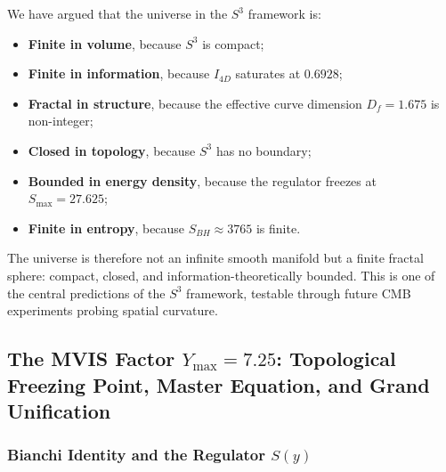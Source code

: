 \documentclass[a4paper,1pt,oneside,openany]{book}
\begin{document}
We have argued that the universe in the $S^{3}$ framework is:
\begin{itemize}
\item \textbf{Finite in volume}, because $S^{3}$ is compact;
\item \textbf{Finite in information}, because $I_{4D}$ saturates 
at $0.6928$;
\item \textbf{Fractal in structure}, because the effective 
curve dimension $D_{f}=1.675$ is non-integer;
\item \textbf{Closed in topology}, because $S^{3}$ has no 
boundary;
\item \textbf{Bounded in energy density}, because the regulator 
freezes at $S_{\max}=27.625$;
\item \textbf{Finite in entropy}, because $S_{BH}\approx 3765$ 
is finite.
\end{itemize}
The universe is therefore not an infinite smooth manifold but 
a finite fractal sphere: compact, closed, and 
information-theoretically bounded. This is one of the central 
predictions of the $S^{3}$ framework, testable through future 
CMB experiments probing spatial curvature.
\subsection{The MVIS Factor \(Y_{\max} = 7.25\): Topological Freezing Point, Master Equation, and Grand Unification}
\label{sub:mvis_unification}

\subsubsection{Bianchi Identity and the Regulator \(S(y)\)}
\label{sssec:bianchi_regulator}
\end{document}
